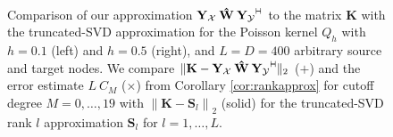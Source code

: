 \documentclass[11pt,a4paper,twoside,bibtotoc]{scrartcl}
\theoremstyle{plain}
\theoremstyle{definition}
\theoremstyle{remark}
\newcommand{\adj}{{\vdash \hspace*{-1.72mm} \dashv}}
\newcommand{\mb}[1]{\mathbf{#1}}
\newcommand{\V}[1]{\mb{#1}}
\numberwithin{equation}{section}
\numberwithin{table}{section}
\numberwithin{figure}{section}
\begin{document}
\begin{figure}[tb]
  \centering
  \hfill
  \\
  \caption{Comparison of our approximation $\V{Y_{\mathcal{X}}} \: \V{\hat W} \: 
  \V{Y_{\mathcal{Y}}}^{\adj}$ to the matrix $\V{K}$ with the truncated-SVD approximation
  for the Poisson kernel $Q_{h}$ with $h=0.1$ (left) and $h=0.5$ (right), 
  and $L = D = 400$ arbitrary source and target nodes. 
  We compare 
  $\|\V{K} - \V{Y_{\mathcal{X}}} \: \V{\hat W} \: \V{Y_{\mathcal{Y}}}^{\adj}\|_{2}$ 
  ($+$) and the error estimate $L \: C_{M}$ ($\times$) from Corollary \ref{cor:rankapprox} 
  for cutoff degree $M=0,\ldots,19$ with 
  $\left\|\V{K} - \V{S}_{l}\right\|_{2}$ (solid) for 
  the truncated-SVD rank $l$ approximation $\V{S}_{l}$ for $l=1,\ldots,L$.
  }
  \label{fig:rankapprox}
\end{figure}


\end{document}
